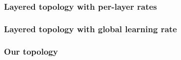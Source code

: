 \documentclass[utf8]{frontiersSCNS}
\begin{document}
\subsubsection{Layered topology with per-layer rates}
\label{sec:basic_topology}


\subsubsection{Layered topology with global learning rate}
\label{sec:basic_topology_uniform}


\subsubsection{Our topology}
\label{sec:our_topology}
\end{document}
